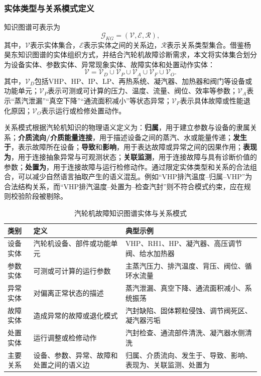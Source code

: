 \subsubsection{实体类型与关系模式定义}

知识图谱可表示为
\begin{equation}
    \mathcal{G}_{KG}=(\mathcal{V},\mathcal{E},\mathcal{R}),
    \label{eq:kg_definition}
\end{equation}
其中，$\mathcal{V}$表示实体集合，$\mathcal{E}$表示实体之间的关系边，$\mathcal{R}$表示关系类型集合。借鉴杨昊东知识图谱的实体组织方式，并结合汽轮机故障诊断需求，本文将实体集合划分为设备实体、参数实体、异常现象实体、故障实体和处置动作实体：
\begin{equation}
\mathcal{V}=\mathcal{V}_{D}\cup\mathcal{V}_{P}\cup\mathcal{V}_{A}\cup\mathcal{V}_{F}\cup\mathcal{V}_{O}.
\end{equation}
其中，$\mathcal{V}_{D}$包括VHP、HP、IP、LP、再热系统、凝汽器、加热器和阀门等设备或功能单元；$\mathcal{V}_{P}$表示可测或可计算的压力、温度、流量、阀位、效率等参数；$\mathcal{V}_{A}$表示“蒸汽泄漏”“真空下降”“通流面积减小”等状态异常；$\mathcal{V}_{F}$表示具体故障或性能退化原因；$\mathcal{V}_{O}$表示运行或检修处置动作。

关系模式根据汽轮机知识的物理语义定义为：\textbf{归属}，用于建立参数与设备的隶属关系；\textbf{介质流向/介质能量连接}，用于描述设备之间的蒸汽、水或能量传递；\textbf{发生于}，表示故障所在设备；\textbf{导致}和\textbf{影响}，用于表达故障或异常之间的因果作用；\textbf{表现为}，用于连接抽象异常与可观测状态；\textbf{关联监测}，用于连接故障与具有诊断价值的参数；\textbf{处置为}，用于连接故障与运行检修动作。通过限定实体类型和关系的合法组合，可以减少自然语言抽取产生的语义混乱。例如“VHP排汽温度--归属--VHP”为合法结构关系，而“VHP排汽温度--处置为--检查汽封”则不符合模式约束，应在规则校验阶段被剔除。

\begin{table}[htbp]
\centering
\caption{汽轮机故障知识图谱实体与关系模式}
\label{tab:kg_schema}
\begin{tabular}{p{2.2cm}p{5.2cm}p{6.2cm}}
\toprule
类别 & 定义 & 典型示例 \\
\midrule
设备实体 & 汽轮机设备、部件或功能单元 & VHP、RH1、HP、凝汽器、高压调节阀、给水加热器 \\
参数实体 & 可测或可计算的运行参数 & 主蒸汽压力、排汽温度、背压、阀位、循环水流量 \\
异常实体 & 对偏离正常状态的描述 & 蒸汽泄漏、真空下降、通流面积减小、系统振荡 \\
故障实体 & 造成异常的故障或退化模式 & 汽封缺陷、固体颗粒侵蚀、调节阀死区、凝汽器污垢 \\
处置实体 & 运行调整或检修动作 & 汽封检查、通流部件清洗、凝汽器水侧清洗 \\
\midrule
主要关系 & 设备、参数、异常、故障和处置之间的语义边 & 归属、介质流向、发生于、导致、影响、表现为、关联监测、处置为 \\
\bottomrule
\end{tabular}
\end{table}

